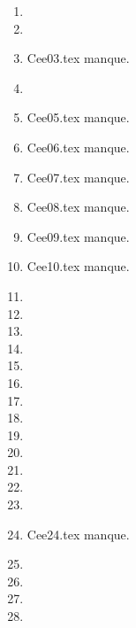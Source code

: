 \begin{enumerate}
  \item  
  \item  
  \item Cee03.tex manque. 
  \item  
  \item Cee05.tex manque. 
  \item Cee06.tex manque. 
  \item Cee07.tex manque. 
  \item Cee08.tex manque. 
  \item Cee09.tex manque. 
  \item Cee10.tex manque. 
  \item  
  \item  
  \item  
  \item  
  \item  
  \item  
  \item  
  \item  
  \item  
  \item  
  \item  
  \item  
  \item  
  \item Cee24.tex manque. 
  \item  
  \item  
  \item  
  \item  
\end{enumerate} 
